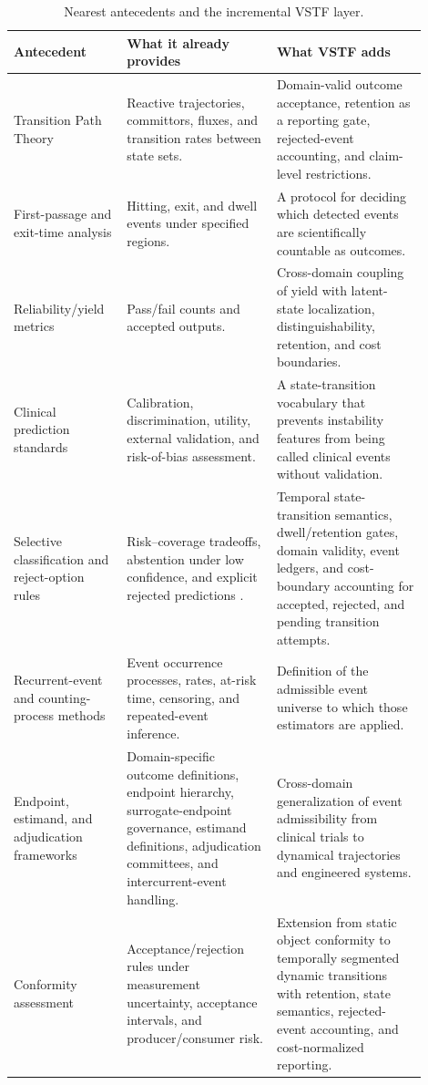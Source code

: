 \documentclass[11pt,a4paper]{article}
\newcommand{\1}{\mathbf{1}}
\begin{document}
\begin{table}[h]
\centering
\caption{Nearest antecedents and the incremental VSTF layer.}
\label{tab:antecedents}
\begin{tabular}{p{0.24\linewidth}p{0.33\linewidth}p{0.33\linewidth}}
\toprule
Antecedent & What it already provides & What VSTF adds \\
\midrule
Transition Path Theory & Reactive trajectories, committors, fluxes, and transition rates between state sets. & Domain-valid outcome acceptance, retention as a reporting gate, rejected-event accounting, and claim-level restrictions. \\
First-passage and exit-time analysis & Hitting, exit, and dwell events under specified regions. & A protocol for deciding which detected events are scientifically countable as outcomes. \\
Reliability/yield metrics & Pass/fail counts and accepted outputs. & Cross-domain coupling of yield with latent-state localization, distinguishability, retention, and cost boundaries. \\
Clinical prediction standards & Calibration, discrimination, utility, external validation, and risk-of-bias assessment. & A state-transition vocabulary that prevents instability features from being called clinical events without validation. \\
Selective classification and reject-option rules & Risk--coverage tradeoffs, abstention under low confidence, and explicit rejected predictions \cite{chow1970reject,geifman2017selective}. & Temporal state-transition semantics, dwell/retention gates, domain validity, event ledgers, and cost-boundary accounting for accepted, rejected, and pending transition attempts. \\
Recurrent-event and counting-process methods & Event occurrence processes, rates, at-risk time, censoring, and repeated-event inference. & Definition of the admissible event universe to which those estimators are applied. \\
Endpoint, estimand, and adjudication frameworks & Domain-specific outcome definitions, endpoint hierarchy, surrogate-endpoint governance, estimand definitions, adjudication committees, and intercurrent-event handling. & Cross-domain generalization of event admissibility from clinical trials to dynamical trajectories and engineered systems. \\
Conformity assessment & Acceptance/rejection rules under measurement uncertainty, acceptance intervals, and producer/consumer risk. & Extension from static object conformity to temporally segmented dynamic transitions with retention, state semantics, rejected-event accounting, and cost-normalized reporting. \\

\end{tabular}
\end{table}
\end{document}
